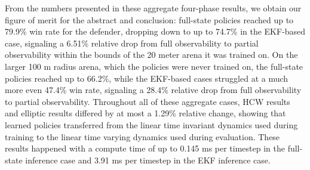 From the numbers presented in these aggregate four-phase results, we obtain our figure of merit for the abstract and conclusion: full-state policies reached up to 79.9\% win rate for the defender, dropping down to up to 74.7\% in the EKF-based case, signaling a 6.51\% relative drop from full observability to partial observability within the bounds of the 20 meter arena it was trained on. On the larger 100 m radius arena, which the policies were never trained on, the full-state policies reached up to 66.2\%, while the EKF-based cases struggled at a much more even 47.4\% win rate, signaling a 28.4\% relative drop from full observability to partial observability. Throughout all of these aggregate cases, HCW results and elliptic results differed by at most a 1.29\% relative change, showing that learned policies transferred from the linear time invariant dynamics used during training to the linear time varying dynamics used during evaluation. These results happened with a compute time of up to 0.145 ms per timestep in the full-state inference case and 3.91 ms per timestep in the EKF inference case.






